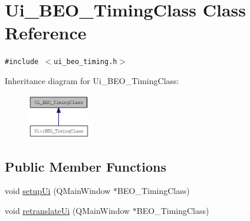 \hypertarget{class_ui___b_e_o___timing_class}{
\section{Ui\_\-BEO\_\-TimingClass Class Reference}
\label{class_ui___b_e_o___timing_class}
}
{\tt \#include $<$ui\_\-beo\_\-timing.h$>$}

Inheritance diagram for Ui\_\-BEO\_\-TimingClass:\nopagebreak
\begin{figure}[H]
\begin{center}
\leavevmode
\includegraphics[width=77pt]{class_ui___b_e_o___timing_class__inherit__graph}
\end{center}
\end{figure}
\subsection*{Public Member Functions}
\begin{CompactItemize}
\item 
void \hyperlink{class_ui___b_e_o___timing_class_1c3e4c81dd35c43209c07487ed5a841c}{setupUi} (QMainWindow $\ast$BEO\_\-TimingClass)
\item 
void \hyperlink{class_ui___b_e_o___timing_class_e3a56257329a6c1eb15b98af80d6ded1}{retranslateUi} (QMainWindow $\ast$BEO\_\-TimingClass)
\end{CompactItemize}
